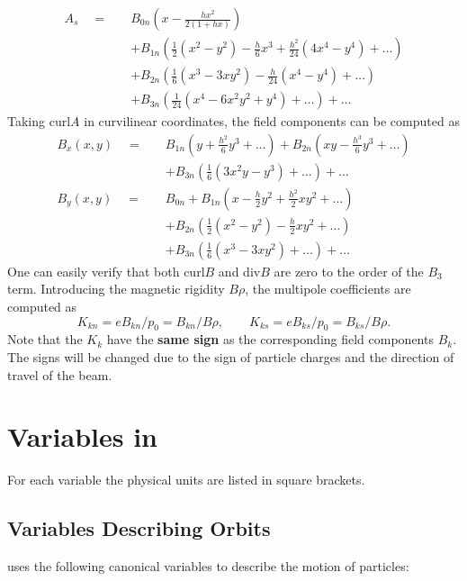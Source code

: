 \begin{align*} 
  A_s \quad = \quad 
  & B_{0n}\left(x-\frac{hx^2}{2(1+hx)}\right) \\
  &+B_{1n}\left(\frac{1}{2}(x^2-y^2)-\frac{h}{6}x^{3}
  +\frac{h^2}{24}(4x^{4}-y^{4})+\ldots\right) \\
  &+B_{2n}\left(\frac{1}{6}(x^{3}-3xy^2)-\frac{h}{24}(x^{4}-y^{4})
   +\ldots\right) \\
  &+B_{3n}\left(\frac{1}{24}(x^{4}-6x^2y^2+y^{4})+\ldots\right)
   + \ldots
\end{align*}
Taking $\mathrm{curl} A$ in curvilinear coordinates,
the field components can be computed as
\begin{align*} 
  B_x(x,y) \quad = \quad
  & B_{1n}\left(y+\frac{h^2}{6}y^{3}+\ldots\right) 
   +B_{2n}\left(xy-\frac{h^{3}}{6}y^{3}+\ldots\right) \\
  &+B_{3n}\left(\frac{1}{6}(3x^2y-y^{3})+\ldots\right) + \ldots \\
  B_y(x,y) \quad = \quad 
  & B_{0n}
   +B_{1n}\left(x-\frac{h}{2}y^2+\frac{h^2}{2}xy^2+\ldots\right) \\
  &+B_{2n}\left(\frac{1}{2}(x^2-y^2)-\frac{h}{2}xy^2+\ldots\right) \\
  &+B_{3n}\left(\frac{1}{6}(x^{3}-3xy^2)+\ldots\right) + \ldots
\end{align*}
One can easily verify that both $\mathrm{curl} B$ and $\mathrm{div} B$
are zero to the order of the $B_3$ term.
Introducing the magnetic rigidity $B \rho$,
the multipole coefficients are computed as
\[
K_{kn}=eB_{kn}/p_0=B_{kn}/B\rho,\qquad
K_{ks}=eB_{ks}/p_0=B_{ks}/B\rho.
\]
Note that the $K_k$ have the \textbf{same sign} as the corresponding
field components $B_k$.
The signs will be changed due to the sign of particle charges and
the direction of travel of the beam.

\section{Variables in \opalt}
\label{sec:variablesopalt}
For each variable the physical units are listed in square brackets.

\subsection{Variables Describing Orbits}
\label{sec:opalt:canon}
\opalt uses the following canonical variables
to describe the motion of particles:

